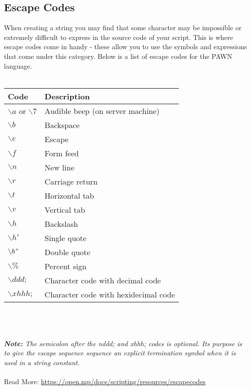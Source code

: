 \documentclass{article}
\begin{document}
\subsection{Escape Codes}
When creating a string you may find that some character may be impossible or extremely difficult to express in the source code of your script. This is where escape codes come in handy - these allow you to use the symbols and expressions that come under this category. Below is a list of escape codes for the PAWN language.
\\
\\
\begin{tabular}{ |l|l| }
\hline
Code & Description \\
\hline
$\backslash a$ or $\backslash 7$ & Audible beep (on server machine) \\
$\backslash b$ & Backspace \\
$\backslash e$ & Escape \\
$\backslash f$ & Form feed \\
$\backslash n$ & New line \\
$\backslash r$ & Carriage return \\
$\backslash t$ & Horizontal tab \\
$\backslash v$ & Vertical tab \\
$\backslash h$ & Backslash \\
$\backslash h'$ & Single quote \\
$\backslash h"$ & Double quote \\
$\backslash \%$ & Percent sign \\
$\backslash ddd;$ & Character code with decimal code \\
$\backslash xhhh;$ & Character code with hexidecimal code \\
\hline
\end{tabular}
\\\\
\\\textit{\textbf{Note:} The semicolon after the nddd; and xhhh; codes is optional. Its purpose is to give the escape sequence sequence an explicit termination symbol when it is used in a string constant.}
\\
\\Read More: \url{https://open.mp/docs/scripting/resources/escapecodes}


\newpage
\end{document}
